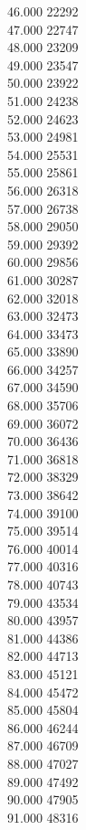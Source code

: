 { 46.000	22292 \\
 47.000	22747 \\
 48.000	23209 \\
 49.000	23547 \\
 50.000	23922 \\
 51.000	24238 \\
 52.000	24623 \\
 53.000	24981 \\
 54.000	25531 \\
 55.000	25861 \\
 56.000	26318 \\
 57.000	26738 \\
 58.000	29050 \\
 59.000	29392 \\
 60.000	29856 \\
 61.000	30287 \\
 62.000	32018 \\
 63.000	32473 \\
 64.000	33473 \\
 65.000	33890 \\
 66.000	34257 \\
 67.000	34590 \\
 68.000	35706 \\
 69.000	36072 \\
 70.000	36436 \\
 71.000	36818 \\
 72.000	38329 \\
 73.000	38642 \\
 74.000	39100 \\
 75.000	39514 \\
 76.000	40014 \\
 77.000	40316 \\
 78.000	40743 \\
 79.000	43534 \\
 80.000	43957 \\
 81.000	44386 \\
 82.000	44713 \\
 83.000	45121 \\
 84.000	45472 \\
 85.000	45804 \\
 86.000	46244 \\
 87.000	46709 \\
 88.000	47027 \\
 89.000	47492 \\
 90.000	47905 \\
 91.000	48316 \\
}
